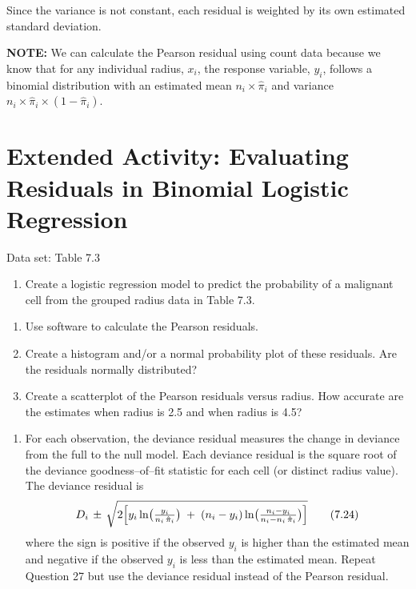 \documentclass[
]{report}
\providecommand{\tightlist}{%
  \setlength{\itemsep}{0pt}\setlength{\parskip}{0pt}}
\begin{document}
Since the variance is not constant, each residual is weighted by its own estimated standard deviation.

\large

\textbf{NOTE:}
We can calculate the Pearson residual using count data because we know that for any individual radius, \(x_i\), the response variable, \(y_i\), follows a binomial distribution with an estimated mean \(n_i \times \hat\pi_i\) and variance \(n_i \times \hat\pi_i \times (1 - \hat\pi_i)\).\\
\normalsize

\section*{Extended Activity: Evaluating Residuals in Binomial Logistic Regression}\label{extended-activity-evaluating-residuals-in-binomial-logistic-regression}

Data set: Table 7.3

\begin{enumerate}
\def\labelenumi{\arabic{enumi}.}
\setcounter{enumi}{26}
\tightlist
\item
  Create a logistic regression model to predict the probability of a malignant cell from the grouped radius data in Table 7.3.\\
\end{enumerate}

\begin{enumerate}
\def\labelenumi{\alph{enumi}.}
\tightlist
\item
  Use software to calculate the Pearson residuals.\\
\item
  Create a histogram and/or a normal probability plot of these residuals. Are the residuals normally distributed?\\
\item
  Create a scatterplot of the Pearson residuals versus radius. How accurate are the estimates when radius is 2.5 and when radius is 4.5?
\end{enumerate}

\begin{enumerate}
\def\labelenumi{\arabic{enumi}.}
\setcounter{enumi}{27}
\tightlist
\item
  For each observation, the deviance residual measures the change in deviance from the full to the null model. Each deviance residual is the square root of the deviance goodness--of--fit statistic for each cell (or distinct radius value). The deviance residual is
  \begin{align}
  D_i \,\pm\, \sqrt{2 \Bigl[
  y_i \ln\bigl(\tfrac{y_i}{n_i\,\hat\pi_i}\bigr)
  \;+\;(n_i - y_i)\ln\bigl(\tfrac{n_i - y_i}{n_i - n_i\,\hat\pi_i}\bigr)
  \Bigr]}
  \tag{7.24}
  \end{align}
  where the sign is positive if the observed \(y_i\) is higher than the estimated mean and negative if the
  observed \(y_i\) is less than the estimated mean. Repeat Question 27 but use the deviance residual instead
  of the Pearson residual.
\end{enumerate}
\end{document}

